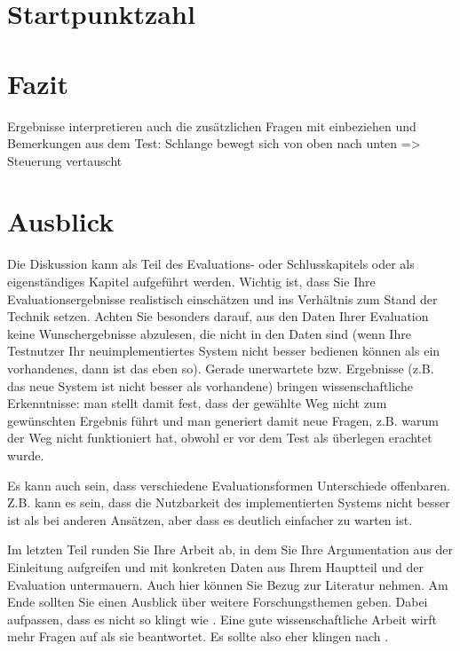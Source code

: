 \section{Startpunktzahl}

\section{Fazit}
Ergebnisse interpretieren auch die zusätzlichen Fragen mit einbeziehen und Bemerkungen aus dem Test: Schlange bewegt sich von oben nach unten => Steuerung vertauscht
\section{Ausblick}

Die Diskussion kann als Teil des Evaluations- oder Schlusskapitels oder als eigenständiges Kapitel aufgeführt werden. Wichtig ist, dass Sie Ihre Evaluationsergebnisse realistisch einschätzen und ins Verhältnis zum Stand der Technik setzen. Achten Sie besonders darauf, aus den Daten Ihrer Evaluation keine Wunschergebnisse abzulesen, die nicht in den Daten sind (wenn Ihre Testnutzer Ihr neuimplementiertes System nicht besser bedienen können als ein vorhandenes, dann ist das eben so). Gerade unerwartete bzw.  Ergebnisse (z.B. das neue System ist nicht besser als vorhandene) bringen wissenschaftliche Erkenntnisse: man stellt damit fest, dass der gewählte Weg nicht zum gewünschten Ergebnis führt und man generiert damit neue Fragen, z.B. warum der Weg nicht funktioniert hat, obwohl er vor dem Test als überlegen erachtet wurde.

Es kann auch sein, dass verschiedene Evaluationsformen Unterschiede offenbaren. Z.B. kann es sein, dass die Nutzbarkeit des implementierten Systems nicht besser ist als bei anderen Ansätzen, aber dass es deutlich einfacher zu warten ist.


Im letzten Teil runden Sie Ihre Arbeit ab, in dem Sie Ihre Argumentation aus der Einleitung aufgreifen und mit konkreten Daten aus Ihrem Hauptteil und der Evaluation untermauern. Auch hier können Sie Bezug zur Literatur nehmen. Am Ende sollten Sie einen Ausblick über weitere Forschungsthemen geben. Dabei aufpassen, dass es nicht so klingt wie . Eine gute wissenschaftliche Arbeit wirft mehr Fragen auf als sie beantwortet. Es sollte also eher klingen nach .
